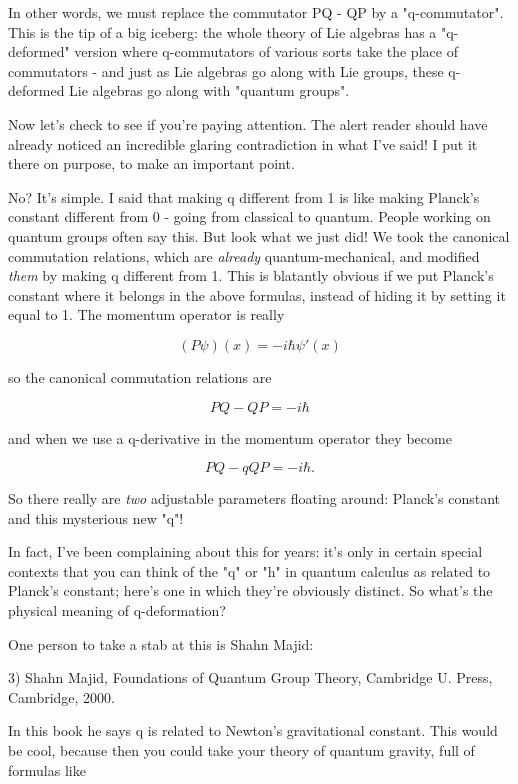 In other words, we must replace the commutator PQ - QP by a
"q-commutator".  This is the tip of a big iceberg: the whole
theory of Lie algebras has a "q-deformed" version where
q-commutators of various sorts take the place of commutators - and just
as Lie algebras go along with Lie groups, these q-deformed Lie algebras
go along with "quantum groups".

Now let's check to see if you're paying attention.  The alert reader
should have already noticed an incredible glaring contradiction in what
I've said!  I put it there on purpose, to make an important point.

No?  It's simple.  I said that making q different from 1 is like making
Planck's constant different from 0 - going from classical to quantum. 
People working on quantum groups often say this.  But look what we just
did!  We took the canonical commutation relations, which are \emph{already}
quantum-mechanical, and modified \emph{them} by making q different from 1. 
This is blatantly obvious if we put Planck's constant where it belongs
in the above formulas, instead of hiding it by setting it equal to 1. 
The momentum operator is really


$$

(P \psi )(x) = -i \hbar  \psi '(x)
$$
    
so the canonical commutation relations are 


$$

PQ - QP = -i \hbar 
$$
    
and when we use a q-derivative in the momentum operator they become


$$

PQ - qQP = -i \hbar .
$$
    
So there really are \emph{two} adjustable parameters floating around:
Planck's constant and this mysterious new "q"!

In fact, I've been complaining about this for years: it's only in
certain special contexts that you can think of the "q" or
"h" in quantum calculus as related to Planck's constant;
here's one in which they're obviously distinct.  So what's the physical
meaning of q-deformation?

One person to take a stab at this is Shahn Majid:

3) Shahn Majid, Foundations of Quantum Group Theory, Cambridge U.
Press, Cambridge, 2000.

In this book he says q is related to Newton's gravitational constant.
This would be cool, because then you could take your theory of quantum 
gravity, full of formulas like


